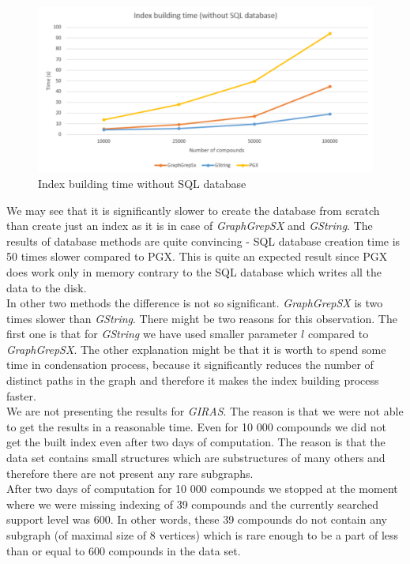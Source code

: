 \begin{figure}[h]
	\centering
	\includegraphics[width=1\textwidth]{../img/indexBuildingTimeNoSQL.pdf}
	\caption{Index building time without SQL database}
	\label{fig:indextimenosql}
\end{figure}

We may see that it is significantly slower to create the database from scratch than create just an index as it is in case of \textit{GraphGrepSX} and \textit{GString}. The results of database methods are quite convincing - SQL database creation time is 50 times slower compared to PGX. This is quite an expected result since PGX does work only in memory contrary to the SQL database which writes all the data to the disk.\\

In other two methods the difference is not so significant. \textit{GraphGrepSX} is two times slower than \textit{GString}. There might be two reasons for this observation. The first one is that for \textit{GString} we have used smaller parameter $l$ compared to \textit{GraphGrepSX}. The other explanation might be that it is worth to spend some time in condensation process, because it significantly reduces the number of distinct paths in the graph and therefore it makes the index building process faster.\\

We are not presenting the results for \textit{GIRAS}. The reason is that we were not able to get the results in a reasonable time. Even for 10 000 compounds we did not get the built index even after two days of computation. The reason is that the data set contains small structures which are substructures of many others and therefore there are not present any rare subgraphs.\\

After two days of computation for 10 000 compounds we stopped at the moment where we were missing indexing of 39 compounds and the currently searched support level was 600. In other words, these 39 compounds do not contain any subgraph (of maximal size of 8 vertices) which is rare enough to be a part of less than or equal to 600 compounds in the data set.\\

